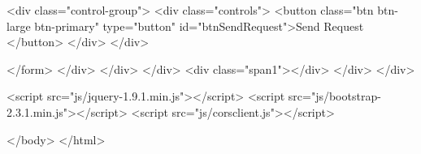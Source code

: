 \begin{Exercise}[label={websec-cors-practs}]
\begin{html}
<div class="control-group">
<div class="controls">
<button class="btn btn-large btn-primary" type="button" id="btnSendRequest">Send
Request
</button>
</div>
</div>

</form>
</div>
</div>
</div>
<div class="span1"></div>
</div>
</div>

<script src="js/jquery-1.9.1.min.js"></script>
<script src="js/bootstrap-2.3.1.min.js"></script>
<script src="js/corsclient.js"></script>


</body>
</html>
\end{html}
\end{Exercise}

\begin{Answer}[ref={websec-cors-practs}]
\end{Answer}